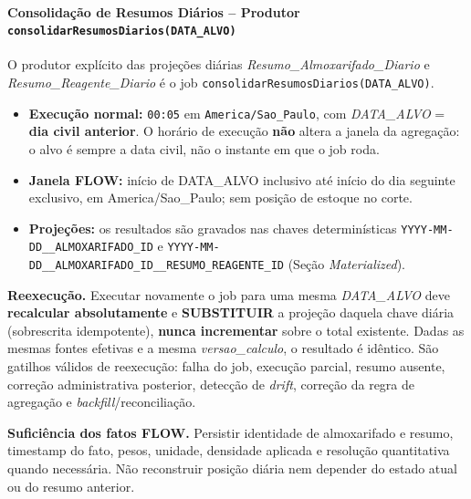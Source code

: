 \paragraph{Consolidação de Resumos Diários -- Produtor \texttt{consolidarResumosDiarios(DATA\_ALVO)}}
O produtor explícito das projeções diárias \textit{Resumo\_Almoxarifado\_Diario} e \textit{Resumo\_Reagente\_Diario} é o job \texttt{consolidarResumosDiarios(DATA\_ALVO)}.
\begin{itemize}
    \item \textbf{Execução normal:} \texttt{00:05} em \texttt{America/Sao\_Paulo}, com \textit{DATA\_ALVO} = \textbf{dia civil anterior}. O horário de execução \textbf{não} altera a janela da agregação: o alvo é sempre a data civil, não o instante em que o job roda.
    \item \textbf{Janela FLOW:} início de DATA\_ALVO inclusivo até início do dia seguinte exclusivo, em America/Sao\_Paulo; sem posição de estoque no corte.
    \item \textbf{Projeções:} os resultados são gravados nas chaves determinísticas \texttt{YYYY-MM-DD\_\_ALMOXARIFADO\_ID} e \texttt{YYYY-MM-DD\_\_ALMOXARIFADO\_ID\_\_RESUMO\_REAGENTE\_ID} (Seção \textit{Materialized}).
\end{itemize}

\textbf{Reexecução.} Executar novamente o job para uma mesma \textit{DATA\_ALVO} deve \textbf{recalcular absolutamente} e \textbf{SUBSTITUIR} a projeção daquela chave diária (sobrescrita idempotente), \textbf{nunca incrementar} sobre o total existente. Dadas as mesmas fontes efetivas e a mesma \textit{versao\_calculo}, o resultado é idêntico. São gatilhos válidos de reexecução: falha do job, execução parcial, resumo ausente, correção administrativa posterior, detecção de \textit{drift}, correção da regra de agregação e \textit{backfill}/reconciliação.

\textbf{Suficiência dos fatos FLOW.} Persistir identidade de almoxarifado e resumo, timestamp do fato, pesos, unidade, densidade aplicada e resolução quantitativa quando necessária. Não reconstruir posição diária nem depender do estado atual ou do resumo anterior.

